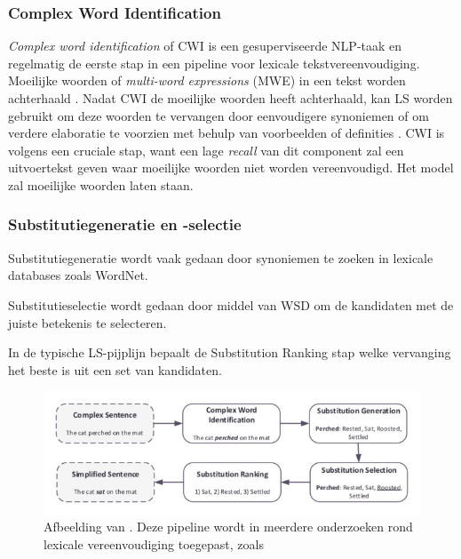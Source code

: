 
\subsubsection{Complex Word Identification}

\textit{Complex word identification} of CWI is een gesuperviseerde NLP-taak en regelmatig de eerste stap in een pipeline voor lexicale tekstvereenvoudiging. Moeilijke woorden of \textit{multi-word expressions} (MWE) in een tekst worden achterhaald  \autocite{Shardlow2013, Gooding2019}. Nadat CWI de moeilijke woorden heeft achterhaald, kan LS worden gebruikt om deze woorden te vervangen door eenvoudigere synoniemen of om verdere elaboratie te voorzien met behulp van voorbeelden of definities \autocite{Zeng2005, Kandula2010}. CWI is volgens \textcite{Shardlow2013} een cruciale stap, want een lage \textit{recall} van dit component zal een uitvoertekst geven waar moeilijke woorden niet worden vereenvoudigd. Het model zal moeilijke woorden laten staan.

\subsubsection{Substitutiegeneratie en -selectie}

Substitutiegeneratie wordt vaak gedaan door synoniemen te zoeken in lexicale databases zoals WordNet. 

Substitutieselectie wordt gedaan door middel van WSD om de kandidaten met de juiste betekenis te selecteren. 

In de typische LS-pijplijn bepaalt de Substitution Ranking stap welke vervanging het beste is uit een set van kandidaten.

\begin{figure}[H]
	\includegraphics{img/lexical-simplification-pipeline.png}
	\caption{Afbeelding van \textcite{Althunayyan2021}. Deze pipeline wordt in meerdere onderzoeken rond lexicale vereenvoudiging toegepast, zoals \textcite{Paetzold2016, Bingel2018, Bulte2018}}
\end{figure}

